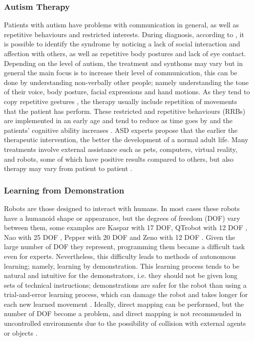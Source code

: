 \documentclass[thesis]{mas_proposal}
\begin{document}
	\subsubsection{Autism Therapy}
		Patients with autism have problems with communication in general, as well as repetitive behaviours and restricted interests. During diagnosis, according to \cite{Brentani2013}, it is possible to identify the syndrome by noticing a lack of social interaction and affection with others, as well as repetitive body postures and lack of eye contact.  Depending on the level of autism, the treatment and synthoms may vary but in general the main focus is to increase their level of communication, this can be done by understanding non-verbally other people; namely understanding the tone of their voice, body posture, facial expressions and hand motions. As they tend to copy repetitive gestures \cite{Dautenhahn2004}, the therapy usually include repetition of movements that the patient has perform. These restricted and repetitive behaviours (RRBs) are implemented in an early age and tend to reduce as time goes by and the patients' cognitive ability increases \cite{Leekam2011}. ASD experts propose that the earlier the therapeutic intervention, the better the development of a normal adult life. Many treatments involve external assistance such as pets, computers, virtual reality, and robots, some of which have positive results compared to others, but also therapy may vary from patient to patient \cite{Scassellati2012}.
		
	\subsubsection{Learning from Demonstration}
		Robots are those designed to interact with humans. In most cases these robots have a humanoid shape or appearance, but the degrees of freedom (DOF) vary between them, some examples are Kaspar with 17 DOF\cite{Kaspar2023}, QTrobot with 12 DOF \cite{qtrobot_safety_manual}, Nao with 25 DOF \cite{softbankrobotics}, Pepper with 20 DOF \cite{softbankrobotics} and Zeno with 12 DOF \cite{Papakostas2021}. Given the large number of DOF they represent, programming them became a difficult task even for experts. Nevertheless, this difficulty leads to methods of autonomous learning; namely, learning by demonstration. This learning process tends to be natural and intuitive for the demonstrators, i.e. they should not be given long sets of technical instructions; demonstrations are safer for the robot than using a trial-and-error learning process, which can damage the robot and takes longer for each new learned movement \cite{Bandera2012}. Ideally, direct mapping can be performed, but the number of DOF become a problem, and direct mapping is not recommended in uncontrolled environments due to the possibility of collision with external agents or objects \cite{Bentivegna2004}.
	
\end{document}
